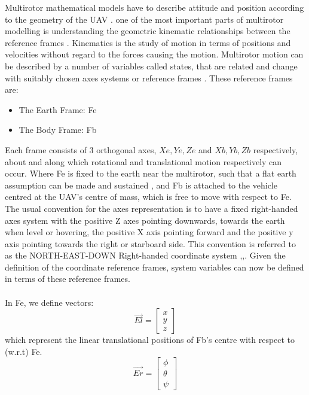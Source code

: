 \documentclass[12pt,a4paper,twoside]{report}
\begin{document}
			Multirotor mathematical models have to describe attitude and position according to the geometry of the UAV \cite{6}. one of the most important parts of multirotor modelling is understanding the geometric kinematic relationships between the reference frames \cite{8}. Kinematics is the study of motion in terms of positions and velocities without regard to the forces causing the motion. Multirotor motion can be described by a number of variables called states, that are related and change with suitably chosen axes systems or reference frames \cite{1}. These reference frames are:
				
			\begin{itemize}
				\item
					The Earth Frame: Fe
				\item 
					The Body Frame: Fb  
			\end{itemize}
			\space
			Each frame consists of 3 orthogonal axes, \(Xe,Ye,Ze\) and \(Xb,Yb,Zb\) respectively, about and along which rotational and translational motion respectively can occur. Where Fe is fixed to the earth near the multirotor, such that a flat earth assumption can be made and sustained \cite{2}, and Fb is attached to the vehicle centred at the UAV’s centre of mass, which is free to move with respect to Fe. The usual convention for the axes representation is to have a fixed right-handed axes system with the positive Z axes pointing downwards, towards the earth when level or hovering, the positive X axis pointing forward and the positive y axis pointing towards the right or starboard side. This convention is referred to as the NORTH-EAST-DOWN Right-handed coordinate system \cite{1},\cite{2},\cite{8}. Given the definition of the coordinate reference frames, system variables can now be defined in terms of these reference frames.
			\\ \\
			In Fe, we define vectors:
			\\
			\begin{equation}
				\vec{El} = 
				\begin{bmatrix}
					x \\
					y \\
					z
				\end{bmatrix}
			\end{equation}
			which represent the linear translational positions of Fb’s centre with respect to (w.r.t) Fe.
			\\
			\begin{equation}
				\vec{Er} = 
				\begin{bmatrix}
					\phi \\
					\theta \\
					\psi
				\end{bmatrix}
			\end{equation}
\end{document}
